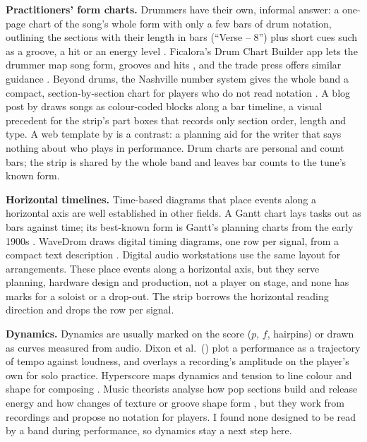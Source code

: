 \documentclass[10pt,twocolumn,a4paper]{article}
\begin{document}
\textbf{Practitioners' form charts.}\label{sec:drumcharts} Drummers have their own,
informal answer: a one-page chart of the song's whole form with only a few bars of
drum notation, outlining the sections with their length in bars (``Verse -- 8'') plus
short cues such as a groove, a hit or an energy level
\citep[e.g.,][]{ellis2025,bergamini2021,ficalora}. Ficalora's Drum Chart Builder app
lets the drummer map song form, grooves and hits \citep{ficalorabuilder}, and the
trade press offers similar guidance \citep{lentz2019}. Beyond drums, the Nashville
number system gives the whole band a compact, section-by-section chart for players who
do not read notation \citep{williams2012}. A blog post by \citet{hein2012} draws songs
as colour-coded blocks along a bar timeline, a visual precedent for the strip's part
boxes that records only section order, length and type. A web template by
\citet{scott} is a contrast: a planning aid for the writer that says nothing about who
plays in performance. Drum charts are personal and count bars; the strip is shared by
the whole band and leaves bar counts to the tune's known form.

\textbf{Horizontal timelines.} Time-based diagrams that place events along a
horizontal axis are well established in other fields. A Gantt chart lays tasks out as
bars against time; its best-known form is Gantt's planning charts from the early 1900s
\citep{wilson2003}. WaveDrom draws digital timing
diagrams, one row per signal, from a compact text description \citep{wavedrom}.
Digital audio workstations use the same layout for arrangements. These place events along a
horizontal axis, but they serve planning, hardware design and
production, not a player on stage, and none has marks for a soloist or a drop-out.
The strip borrows the horizontal reading direction and drops the row per signal.

\textbf{Dynamics.} Dynamics are usually marked on the score ($p$, $f$, hairpins) or
drawn as curves measured from audio. Dixon et al.\ (\citeyear{dixon2002}) plot a
performance as a trajectory of tempo against loudness, and \citet{park2025} overlays a
recording's amplitude on the player's own for solo practice. Hyperscore maps dynamics and
tension to line colour and shape for composing \citep{farbood2007}. Music theorists
analyse how pop sections build and release energy
\citep{summach2011,nobile2022,stroud2022} and how changes of texture or groove shape
form \citep{cobb2025}, but they work from recordings and propose no notation for
players. I found none designed to be read by a band during performance, so dynamics stay
a next step here.
\end{document}
